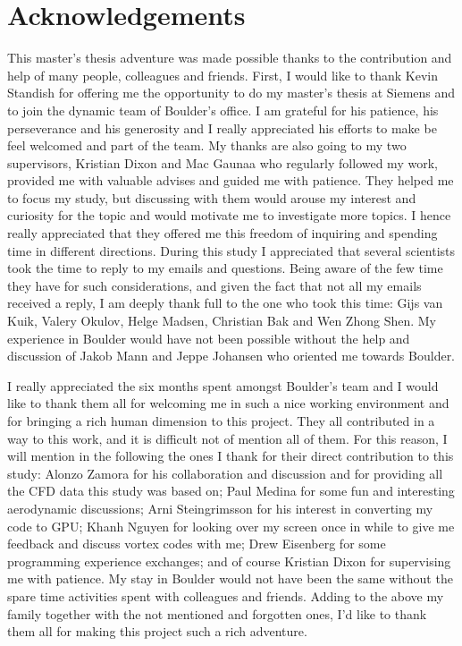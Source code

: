 \documentclass[a4paper,11pt]{book}
\begin{document}
\newpage
\chapter*{Acknowledgements}
This master's thesis adventure was made possible thanks to the contribution and help of many people, colleagues and friends.
First, I would like to thank Kevin Standish for offering me the opportunity to do my master's thesis at Siemens and to join the dynamic team of Boulder's office. I am grateful for his patience, his perseverance and his generosity and I really appreciated his efforts to make be feel welcomed and part of the team. My thanks are also going to my two supervisors, Kristian Dixon and Mac Gaunaa who regularly followed my work, provided me with valuable advises and guided me with patience. They helped me to focus my study, but discussing with them would arouse my interest and curiosity for the topic and would motivate me to investigate more topics. I hence really appreciated that they offered me this freedom of inquiring and spending time in different directions. During this study I appreciated that several scientists took the time to reply to my emails and questions. Being aware of the few time they have for such considerations, and given the fact that not all my emails received a reply, I am deeply thank full to the one who took this time: Gijs van Kuik, Valery Okulov, Helge Madsen, Christian Bak and Wen Zhong Shen. My experience in Boulder would have not been possible without the help and discussion of Jakob Mann and Jeppe Johansen who oriented me towards Boulder. 


I really appreciated the six months spent amongst Boulder's team and I would like to thank them all for welcoming me in such a nice working environment and for bringing a rich human dimension to this project. They all contributed in a way to this work, and it is difficult not of mention all of them. For this reason, I will mention in the following the ones I thank for their direct contribution to this study: Alonzo Zamora for his collaboration and discussion and for providing all the CFD data this study was based on; Paul Medina for some fun and interesting aerodynamic discussions; Arni Steingrimsson for his interest in converting my code to GPU; Khanh Nguyen for looking over my screen once in while to give me feedback and discuss vortex codes with me; Drew Eisenberg for some programming experience exchanges; and of course Kristian Dixon for supervising me with patience. My stay in Boulder would not have been the same without the spare time activities spent with colleagues and friends. Adding to the above my family together with the not mentioned and forgotten ones, I'd like to thank them all for making this project such a rich adventure. 
\end{document}
